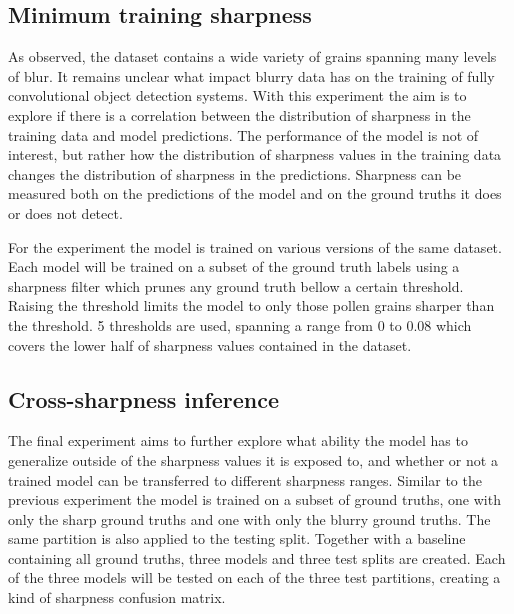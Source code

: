 \subsection{Minimum training sharpness}
As observed, the dataset contains a wide variety of grains spanning many levels of blur.
It remains unclear what impact blurry data has on the training of fully convolutional object detection systems.
With this experiment the aim is to explore if there is a correlation between the distribution of sharpness in the training data and model predictions.
The performance of the model is not of interest, but rather how the distribution of sharpness values in the training data changes the distribution of sharpness in the predictions.
Sharpness can be measured both on the predictions of the model and on the ground truths it does or does not detect.

For the experiment the model is trained on various versions of the same dataset.
Each model will be trained on a subset of the ground truth labels using a sharpness filter which prunes any ground truth bellow a certain threshold.
Raising the threshold limits the model to only those pollen grains sharper than the threshold.
5 thresholds are used, spanning a range from 0 to 0.08 which covers the lower half of sharpness values contained in the dataset.

\subsection{Cross-sharpness inference}
The final experiment aims to further explore what ability the model has to generalize outside of the sharpness values it is exposed to, and whether or not a trained model can be transferred to different sharpness ranges.
Similar to the previous experiment the model is trained on a subset of ground truths, one with only the sharp ground truths and one with only the blurry ground truths.
The same partition is also applied to the testing split.
Together with a baseline containing all ground truths, three models and three test splits are created.
Each of the three models will be tested on each of the three test partitions, creating a kind of sharpness confusion matrix.
